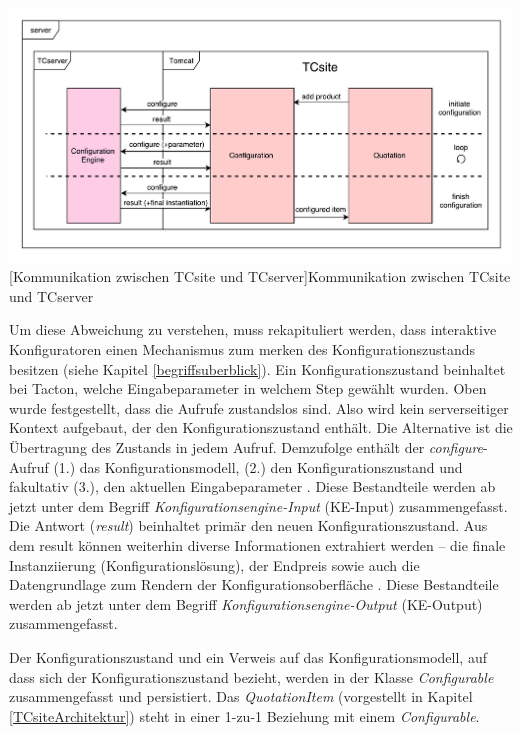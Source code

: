 \documentclass[11pt, a4paper, titlepage, listof=totoc, bibliography=totoc, index=totoc, twoside, openright, headings=normal, draft]{scrreprt}
\begin{document}
\vspace{1em}
\begin{minipage}{\linewidth}
	\centering
	\includegraphics[width=1\linewidth]{Abbildungen/tcsiteTCserverCommunication.pdf}
	[Kommunikation zwischen TCsite und TCserver]{Kommunikation zwischen TCsite und TCserver}
	\label{fig:tcsiteTCserverCommunication}
\end{minipage}
\vspace{0.3em}

Um diese Abweichung zu verstehen, muss rekapituliert werden, dass interaktive Konfiguratoren einen Mechanismus zum merken des Konfigurationszustands besitzen (siehe Kapitel \ref{begriffsuberblick}). Ein Konfigurationszustand beinhaltet bei Tacton, welche Eingabeparameter in welchem Step gewählt wurden. Oben wurde festgestellt, dass die Aufrufe zustandslos sind. Also wird kein serverseitiger Kontext aufgebaut, der den Konfigurationszustand enthält. Die Alternative ist die Übertragung des Zustands in jedem Aufruf. Demzufolge enthält der \emph{configure}-Aufruf (1.) das Konfigurationsmodell, (2.) den Konfigurationszustand und fakultativ (3.), den aktuellen Eingabeparameter \citep{tactonTCsiteApiDocu}. Diese Bestandteile werden ab jetzt unter dem Begriff \emph{Konfigurationsengine-Input} (KE-Input) zusammengefasst. Die Antwort (\emph{result}) beinhaltet primär den neuen Konfigurationszustand. Aus dem result können weiterhin diverse Informationen extrahiert werden --  die finale Instanziierung (Konfigurationslösung), der Endpreis sowie auch die Datengrundlage zum Rendern der Konfigurationsoberfläche \citep{tactonTCsiteApiDocu}. Diese Bestandteile werden ab jetzt unter dem Begriff \emph{Konfigurationsengine-Output} (KE-Output) zusammengefasst.

Der Konfigurationszustand und ein Verweis auf das Konfigurationsmodell, auf dass sich der Konfigurationszustand bezieht, werden in der Klasse \emph{Configurable} zusammengefasst und persistiert. Das \emph{QuotationItem} (vorgestellt in Kapitel  \ref{TCsiteArchitektur}) steht in einer 1-zu-1 Beziehung mit einem \emph{Configurable}.
\end{document}
